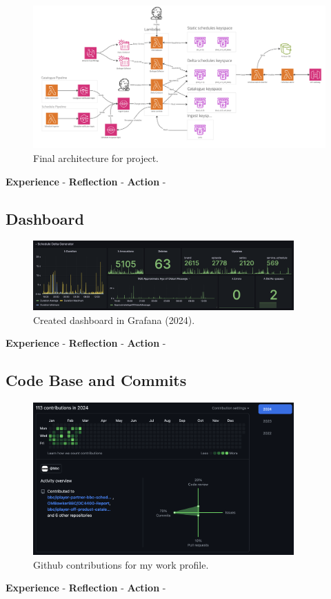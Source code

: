   \begin{landscape}
    \begin{figure}[H]
      \centering
      \includegraphics[width=20cm]{assets/outputs/finalArchitecture.png}
      \caption{Final architecture for project.}
      \label{fig:finalArchitecture}
    \end{figure}
  \end{landscape}

  \textbf{Experience} -
  \textbf{Reflection} -
  \textbf{Action} -

  \newpage
  \subsection{Dashboard}

  \begin{figure}[H]
    \centering
    \includegraphics[width=10cm]{assets/outputs/dashboard.png}
    \caption{Created dashboard in Grafana (2024).}
    \label{fig:dashboard}
  \end{figure}

  \textbf{Experience} -
  \textbf{Reflection} -
  \textbf{Action} -
  
  \newpage
  \subsection{Code Base and Commits}

  \begin{figure}[H]
    \centering
    \includegraphics[width=10cm]{assets/outputs/githubContributions.png}
    \caption{Github contributions for my work profile.}
    \label{fig:githubContributions}
  \end{figure}

  \textbf{Experience} -
  \textbf{Reflection} -
  \textbf{Action} -

\newpage
